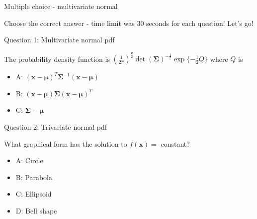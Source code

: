 \documentclass[ignorenonframetext,]{beamer}
\providecommand{\tightlist}{%
  \setlength{\itemsep}{0pt}\setlength{\parskip}{0pt}}
\begin{document}
\begin{frame}

\begin{block}{Multiple choice - multivariate normal}

\vspace{2mm}

Choose the correct answer - time limit was 30 seconds for each question!
Let's go!

\vspace{2mm}

\begin{block}{Question 1: Multivariate normal pdf}

\vspace{2mm}

The probability density function is
\((\frac{1}{2\pi})^\frac{p}{2}\det(\mathbf\Sigma)^{-\frac{1}{2}}\exp\{-\frac{1}{2}Q\}\)
where \(Q\) is

\begin{itemize}
\tightlist
\item
  A:
  \((\mathbf{x}-\mathbf{\mu})^T\mathbf\Sigma^{-1}(\mathbf{x}-\mathbf{\mu})\)
\item
  B:
  \((\mathbf{x}-\mathbf{\mu})\mathbf\Sigma(\mathbf{x}-\mathbf{\mu})^T\)
\item
  C: \(\mathbf\Sigma-\mathbf{\mu}\)
\end{itemize}

\end{block}

\end{block}

\end{frame}

\begin{frame}

\begin{block}{Question 2: Trivariate normal pdf}

\vspace{2mm}

What graphical form has the solution to \(f(\mathbf{x})=\) constant?

\begin{itemize}
\tightlist
\item
  A: Circle
\item
  B: Parabola
\item
  C: Ellipsoid
\item
  D: Bell shape
\end{itemize}

\end{block}

\end{frame}
\end{document}
